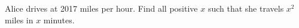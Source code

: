 Alice drives at 2017 miles per hour. Find all positive $ x $ such that she travels $ x^2 $ miles in $ x $ minutes.
